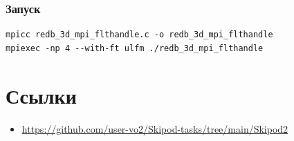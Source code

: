 \documentclass[a4paper,12pt,titlepage,final]{article}
\begin{document}
\subsubsection{Запуск}
\begin{verbatim}
mpicc redb_3d_mpi_flthandle.c -o redb_3d_mpi_flthandle
mpiexec -np 4 --with-ft ulfm ./redb_3d_mpi_flthandle
\end{verbatim}
\section{Ссылки}
\begin{raggedright}
\begin{itemize}
\item \url{https://github.com/user-vo2/Skipod-tasks/tree/main/Skipod2}
\end{itemize}
\end{raggedright}
\end{document}
